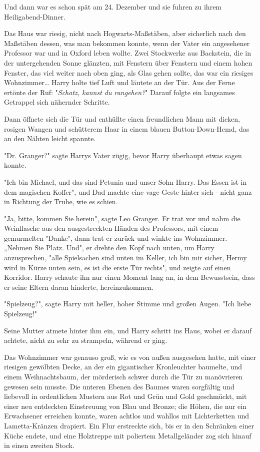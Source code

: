 {Und dann war es schon spät am 24. Dezember und sie fuhren zu ihrem Heiligabend-Dinner.

Das Haus war riesig, nicht nach Hogwarts-Maßstäben, aber sicherlich nach den Maßstäben dessen, was man bekommen konnte, wenn der Vater ein angesehener Professor war und in Oxford leben wollte. Zwei Stockwerke aus Backstein, die in der untergehenden Sonne glänzten, mit Fenstern über Fenstern und einem hohen Fenster, das viel weiter nach oben ging, als Glas gehen sollte, das war ein riesiges Wohnzimmer… Harry holte tief Luft und läutete an der Tür. Aus der Ferne ertönte der Ruf: "\emph{Schatz, kannst du rangehen?}" Darauf folgte ein langsames Getrappel sich nähernder Schritte.

Dann öffnete sich die Tür und enthüllte einen freundlichen Mann mit dicken, rosigen Wangen und schütterem Haar in einem blauen Button-Down-Hemd, das an den Nähten leicht spannte.

"Dr. Granger?" sagte Harrys Vater zügig, bevor Harry überhaupt etwas sagen konnte.

"Ich bin Michael, und das sind Petunia und unser Sohn Harry. Das Essen ist in dem magischen Koffer", und Dad machte eine vage Geste hinter sich - nicht ganz in Richtung der Truhe, wie es schien.

"Ja, bitte, kommen Sie herein", sagte Leo Granger. Er trat vor und nahm die Weinflasche aus den ausgestreckten Händen des Professors, mit einem gemurmelten "Danke", dann trat er zurück und winkte ins Wohnzimmer. „Nehmen Sie Platz. Und", er drehte den Kopf nach unten, um Harry anzusprechen, "alle Spielsachen sind unten im Keller, ich bin mir sicher, Hermy wird in Kürze unten sein, es ist die erste Tür rechts", und zeigte auf einen Korridor. Harry schaute ihn nur einen Moment lang an, in dem Bewusstsein, dass er seine Eltern daran hinderte, hereinzukommen.

"Spielzeug?", sagte Harry mit heller, hoher Stimme und großen Augen. "Ich liebe Spielzeug!"

Seine Mutter atmete hinter ihm ein, und Harry schritt ins Haus, wobei er darauf achtete, nicht zu sehr zu strampeln, während er ging.

Das Wohnzimmer war genauso groß, wie es von außen ausgesehen hatte, mit einer riesigen gewölbten Decke, an der ein gigantischer Kronleuchter baumelte, und einem Weihnachtsbaum, der mörderisch schwer durch die Tür zu manövrieren gewesen sein musste. Die unteren Ebenen des Baumes waren sorgfältig und liebevoll in ordentlichen Mustern aus Rot und Grün und Gold geschmückt, mit einer neu entdeckten Einstreuung von Blau und Bronze; die Höhen, die nur ein Erwachsener erreichen konnte, waren achtlos und wahllos mit Lichterketten und Lametta-Kränzen drapiert. Ein Flur erstreckte sich, bis er in den Schränken einer Küche endete, und eine Holztreppe mit poliertem Metallgeländer zog sich hinauf in einen zweiten Stock.

}
